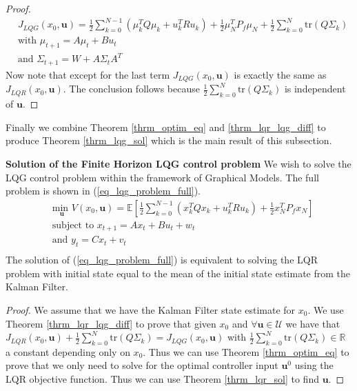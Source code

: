 \begin{proof}
\begin{equation}
\begin{aligned}
&J_{LQG}(x_0, \mathbf{u}) = \frac{1}{2}\sum_{k=0}^{N-1} \left( \mu_k^TQ\mu_k + u_k^TRu_k \right) + \frac{1}{2}\mu_N^TP_f\mu_N + \frac{1}{2}\sum_{k=0}^N \text{tr}(Q\Sigma_k) \\
&\text{with } \mu_{t+1} = A\mu_t +Bu_t \\
&\text{and } \Sigma_{t+1} = W+A\Sigma_t A^T 
\end{aligned}
\label{eq_simpl_obj_func}
\end{equation}
Now note that except for the last term $J_{LQG}(x_0, \mathbf{u})$ is exactly the same as $J_{LQR}(x_0, \mathbf{u})$. The conclusion follows because $\frac{1}{2}\sum_{k=0}^N \text{tr}(Q\Sigma_k)$ is independent of $\mathbf{u}$. 
\end{proof}
Finally we combine Theorem \ref{thrm_optim_eq} and \ref{thrm_lqr_lqg_diff} to produce Theorem \ref{thrm_lqg_sol} which is the main result of this subsection.
\begin{thrm}
\textbf{Solution of the Finite Horizon LQG control problem} We wish to solve the LQG control problem within the framework of Graphical Models. The full problem is shown in (\ref{eq_lqg_problem_full}).
\begin{equation}
\begin{aligned}
&\underset{\mathbf{u}}{\text{min }} V(x_0, \mathbf{u}) = \mathbb{E}\left[ \frac{1}{2}\sum_{k=0}^{N-1} \left( x_k^TQx_k + u_k^TRu_k \right) + \frac{1}{2}x_N^TP_fx_N \right] \\
& \text{subject to } x_{t+1}=Ax_t+Bu_t + w_t \\
& \text{and } y_{t}= Cx_t + v_t \\
\end{aligned}
\label{eq_lqg_problem_full}
\end{equation}
The solution of (\ref{eq_lqg_problem_full}) is equivalent to solving the LQR problem with initial state equal to the mean of the initial state estimate from the Kalman Filter.
\label{thrm_lqg_sol}
\end{thrm}
\begin{proof}
We assume that we have the Kalman Filter state estimate for $x_0$. We use Theorem \ref{thrm_lqr_lqg_diff} to prove that given $x_0$ and $\forall \mathbf{u} \in \mathcal{U}$ we have that $J_{LQR}(x_0, \mathbf{u}) + \frac{1}{2}\sum_{k=0}^N \text{tr}(Q\Sigma_k) = J_{LQG}(x_0, \mathbf{u})$ with $\frac{1}{2}\sum_{k=0}^N \text{tr}(Q\Sigma_k) \in \mathbb{R}$ a constant depending only on $x_0$. Thus we can use Theorem \ref{thrm_optim_eq} to prove that we only need to solve for the optimal controller input $\mathbf{u}^0$ using the LQR objective function. Thus we can use Theorem \ref{thrm_lqr_sol} to find $\mathbf{u}$. 
\end{proof}

